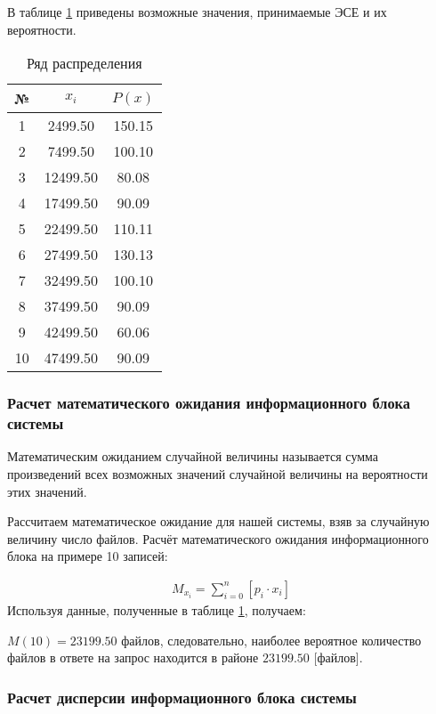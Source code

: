 \documentclass[a4paper,14pt]{extarticle}
\begin{document}
В таблице \ref{tab:probs} приведены возможные значения, принимаемые ЭСЕ и их вероятности.

\begin{table}[h!]
	\centering
	\caption{Ряд распределения}
	\begin{tabular}{|c|c|c|}
		\hline
	№ &	$x_i$ & $P(x)$ \\ \hline\hline
	1 &	2499.50 & 150.15 \\ \hline
	2 &		7499.50 & 100.10 \\ \hline
	3 &		12499.50 & 80.08 \\ \hline
	4 &		17499.50 & 90.09 \\ \hline
	5 &		22499.50 & 110.11 \\ \hline
	6 &		27499.50 & 130.13 \\ \hline
	7 &		32499.50 & 100.10 \\ \hline
	8 &		37499.50 & 90.09 \\ \hline
	9 &		42499.50 & 60.06 \\ \hline
	10 &		47499.50 & 90.09 \\ \hline
	\end{tabular}
	\label{tab:probs}
\end{table}

\subsubsection{Расчет математического ожидания информационного блока системы}
Математическим ожиданием случайной величины называется сумма
произведений всех возможных значений случайной величины на вероятности
этих значений. 

Рассчитаем математическое ожидание для нашей системы, взяв
за случайную величину число файлов. Расчёт математического
ожидания информационного блока на примере 10 записей:

\begin{align}
M_{x_{i}} = \sum_{i=0}^{n}\left[p_i \cdot x_i\right] \label{math:expectation}
\end{align}
Используя данные, полученные в таблице \ref{tab:probs}, получаем:

$M(10) = 23199.50$ файлов, следовательно, наиболее вероятное
количество файлов в ответе на запрос находится в районе $23199.50$ [файлов].

\subsubsection{Расчет дисперсии информационного блока системы}
\end{document}
